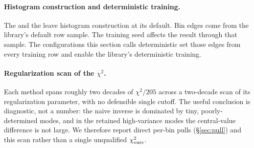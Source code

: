 
\paragraph{Histogram construction and deterministic training.} The \estPurity{} and the \estTwoD{} leave histogram construction at its default. Bin edges come from the library's default row sample. The training seed affects the result through that sample. The configurations this section calls deterministic set those edges from every training row and enable the library's deterministic training.

\paragraph{Regularization scan of the $\chi^{2}$.} Each method spans roughly two decades of $\chi^{2}/205$ across a two-decade scan of its regularization parameter, with no defensible single cutoff. The useful conclusion is diagnostic, not a number: the naive inverse is dominated by tiny, poorly-determined modes, and in the retained high-variance modes the central-value difference is not large. We therefore report direct per-bin pulls (\S\ref{sec:pull}) and this scan rather than a single unqualified $\chi^{2}_{\text{ours}}$.

